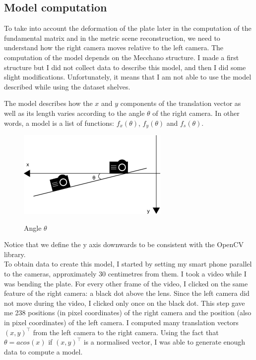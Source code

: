 \documentclass[11pt]{report}
\begin{document}
\subsection{Model computation}

To take into account the deformation of the plate later in the computation of the fundamental matrix and in the metric scene reconstruction, we need to understand how the right camera moves relative to the left camera. The computation of the model depends on the Mecchano structure. I made a first structure but I did not collect data to describe this model, and then I did some slight modifications. Unfortunately, it means that I am not able to use the model described while using the dataset shelves.


The model describes how the $x$ and $y$ components of the translation vector as well as its length varies according to the angle $\theta$ of the right camera. In other words, a model is a list of functions: $f_x(\theta)$, $f_y(\theta)$ and $f_s(\theta)$.

\begin{figure}[H]
    \begin{center}
        \includegraphics[scale=0.4]{images/modeltheta.png} 
        \label{fig:theta}
        \caption{Angle $\theta$}
    \end{center}
\end{figure}

Notice that we define the y axis downwards to be consistent with the OpenCV library.
\\
To obtain data to create this model, I started by setting my smart phone parallel to the cameras, approximately 30 centimetres from them. I took a video while I was bending the plate. For every other frame of the video, I clicked on the same feature of the right camera: a black dot above the lens. Since the left camera did not move during the video, I clicked only once on the black dot. This step gave me 238 positions (in pixel coordinates) of the right camera and the position (also in pixel coordinates) of the left camera. I computed many translation vectors $(x, y)^\top$ from the left camera to the right camera. Using the fact that $\theta=acos(x)$ if $(x,y)^\top$ is a normalised vector, I was able to generate enough data to compute a model.
\end{document}
